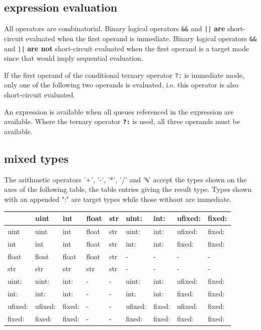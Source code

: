         \subsection{expression evaluation}

            All operators are combinatorial. Binary logical operators \verb'&&' and
            \verb'||' {\bf are} short-circuit evaluated when the first operand is
            immediate. Binary logical operators \verb'&&' and \verb'||' {\bf are
            not} short-circuit evaluated when the first operand is a target mode
            since that would imply sequential evaluation.

            If the first operand of the conditional ternary operator \verb'?:'
            is immediate mode, only one of the following two operands is
            evaluated, i.e. this operator is also short-circuit evaluated.

            An expression is available when all queues referenced in the
            expression are available. Where the ternary operator {\bf \verb'?:'}
            is used, all three operands must be available.

        \subsection{mixed types}

            The arithmetic operators '+', '-', '*', '/' and '\verb"%"' accept
            the types shown on the axes of the following table, the table
            entries giving the result type. Types shown with an appended ":" are
            target types while those without are immediate.

            \begin{tabular}{| l || l | l | l | l | l | l | l | l |}
            \hline
                    & uint    & int    & float & str & uint:   & int:   & ufixed: & fixed: \\
            \hline \hline
            uint    & uint    & int    & float & str & uint:   & int:   & ufixed: & fixed: \\ \hline
            int     & int     & int    & float & str & int:    & int:   & fixed:  & fixed: \\ \hline
            float   & float   & float  & float & str & -       & -      & -       & -      \\ \hline
            str     & str     & str    & str   & str & -       & -      & -       & -      \\ \hline
            uint:   & uint:   & int:   & -     & -   & uint:   & int:   & ufixed: & fixed: \\ \hline
            int:    & int:    & int:   & -     & -   & int:    & int:   & fixed:  & fixed: \\ \hline
            ufixed: & ufixed: & fixed: & -     & -   & ufixed: & fixed: & ufixed: & fixed: \\ \hline
            fixed:  & fixed:  & fixed: & -     & -   & fixed:  & fixed: & fixed:  & fixed: \\ \hline
            \end{tabular}

